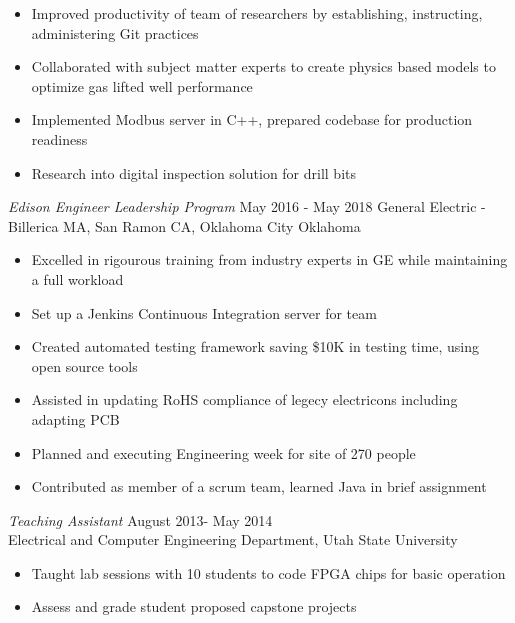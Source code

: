 \documentclass[line,margin]{res}
\begin{document}
\begin{resume}
	\begin{itemize} \itemsep -2pt
		\item Improved productivity of team of researchers by establishing, instructing, administering Git practices
		\item Collaborated with subject matter experts to create physics based models to optimize gas lifted well performance
		\item Implemented Modbus server in C++, prepared codebase for production readiness
		\item Research into digital inspection solution for drill bits
	\end{itemize}
	{\sl Edison Engineer Leadership Program} \hfill May 2016 - May 2018
	General Electric - Billerica MA, San Ramon CA, Oklahoma City Oklahoma
	\begin{itemize} \itemsep -2pt
		\item Excelled in rigourous training from industry experts in GE while maintaining a full workload
		\item Set up a Jenkins Continuous Integration server for team
		\item Created automated testing framework saving \$10K in testing time, using open source tools
		\item Assisted in updating RoHS compliance of legecy electricons including adapting PCB
		\item Planned and executing Engineering week for site of 270 people
		\item Contributed as member of a scrum team, learned Java in brief assignment
	\end{itemize}
	{\sl Teaching Assistant} \hfill August 2013- May 2014 \\
	Electrical and Computer Engineering Department, Utah State University
	\begin{itemize}  \itemsep -2pt %
		\item Taught lab sessions with 10 students to code FPGA chips for
		      basic operation
		\item Assess and grade student proposed capstone projects
	\end{itemize}


\end{resume}
\end{document}

